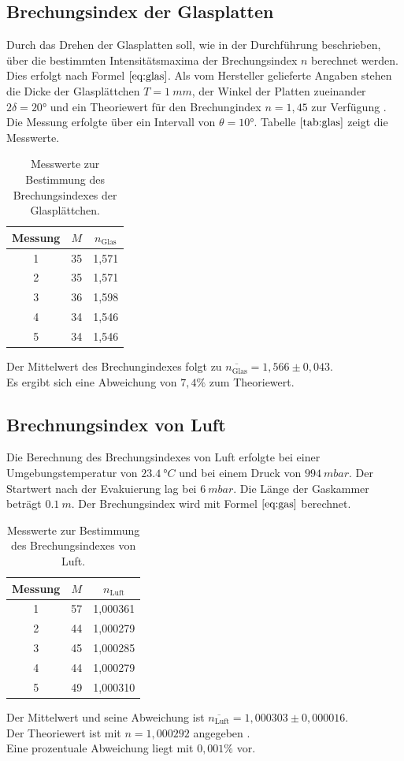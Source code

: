 \subsection{Brechungsindex der Glasplatten}
Durch das Drehen der Glasplatten soll, wie in der Durchführung beschrieben, über die bestimmten Intensitätsmaxima
der Brechungsindex $n$ berechnet werden.
Dies erfolgt nach Formel $\ref{eq:glas}$.
Als vom Hersteller gelieferte Angaben \cite{anleitung} stehen die Dicke der Glasplättchen $T=\SI{1}{mm}$, der Winkel der Platten zueinander $2\delta=20°$ und ein Theoriewert für
den Brechungindex $n= 1,45$ zur Verfügung \cite{brechglas}.
Die Messung erfolgte über ein Intervall von $\theta = 10°$.
Tabelle $\ref{tab:glas}$ zeigt die Messwerte.

\begin{table}[H]
\centering
\begin{tabular}{c c c}
{Messung} & {$M$} & {$n_\text{Glas}$} \\
\midrule
1 & 35 & 1,571 \\
2 & 35 & 1,571 \\
3 & 36 & 1,598 \\
4 & 34 & 1,546 \\
5 & 34 & 1,546 \\
\end{tabular}
\caption{Messwerte zur Bestimmung des Brechungsindexes der Glasplättchen.}
\label{tab:glas}
\end{table}
Der Mittelwert des Brechungindexes folgt zu $\overline{n_\text{Glas}}=1,566 \pm 0,043$.\\
Es ergibt sich eine Abweichung von $7,4 \%$ zum Theoriewert.

\subsection{Brechnungsindex von Luft}
Die Berechnung des Brechungsindexes von Luft erfolgte bei einer Umgebungstemperatur von $\SI{23,4}{°C}$ und bei einem Druck von $\SI{994}{mbar}$.
Der Startwert nach der Evakuierung lag bei $\SI{6}{mbar}$.
Die Länge der Gaskammer beträgt $\SI{0,1}{m}$.
Der Brechungsindex wird mit Formel $\ref{eq:gas}$ berechnet.
\begin{table}[H]
\centering
\begin{tabular}{c c c}
{Messung} & {$M$} & {$n_\text{Luft}$} \\
\midrule
1 & 57 & 1,000361 \\
2 & 44 & 1,000279 \\
3 & 45 & 1,000285 \\
4 & 44 & 1,000279 \\
5 & 49 & 1,000310 \\
\end{tabular}
\caption{Messwerte zur Bestimmung des Brechungsindexes von Luft.}
\label{tab:luft}
\end{table}
Der Mittelwert und seine Abweichung ist $\overline{n_\text{Luft}}= 1,000303 \pm 0,000016$.\\
Der Theoriewert ist mit $n=1,000292$ angegeben \cite{brechglas}.\\
Eine prozentuale Abweichung liegt mit $0,001\%$ vor.
